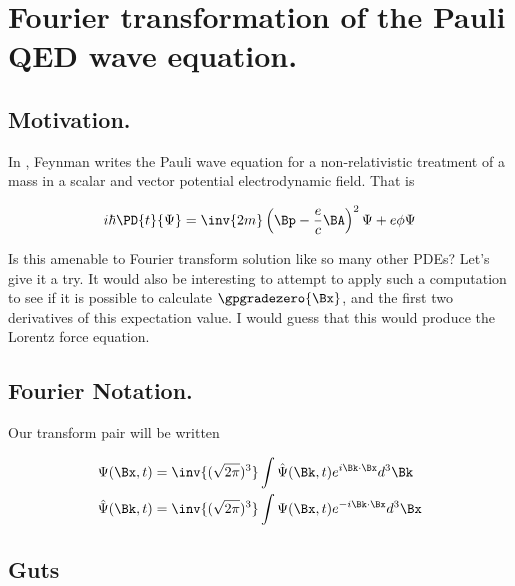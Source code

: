 
%

\chapter{Fourier transformation of the Pauli QED wave equation.}
\label{chap:pauliFourier}
{}
\date{May 29, 2010}

\beginArtNoToc

\section{Motivation.}

In \cite{feynman1961qed}, Feynman writes the Pauli wave equation for a non-relativistic treatment of a mass in a scalar and vector potential electrodynamic field.  That is

\begin{align}\label{eqn:pauliFourier:1}
i \hbar \PD{t}{\Psi} = \inv{2m} \left( \Bp - \frac{e}{c} \BA \right)^2 \Psi + e \phi \Psi
\end{align}

Is this amenable to Fourier transform solution like so many other PDEs?  Let's give it a try.  It would also be interesting to attempt to apply such a computation to see if it is possible to calculate $\gpgradezero{\Bx}$, and the first two derivatives of this expectation value.  I would guess that this would produce the Lorentz force equation.

\section{Fourier Notation.}

Our transform pair will be written

\begin{subequations}
\begin{align}
\Psi(\Bx, t) &= \inv{(\sqrt{2 \pi})^3} \int \hat{\Psi}(\Bk, t) e^{i \Bk \cdot \Bx} d^3 \Bk \label{eqn:pauliFourier:2a} \\
\hat{\Psi}(\Bk, t) &= \inv{(\sqrt{2 \pi})^3} \int \Psi(\Bx, t) e^{-i \Bk \cdot \Bx} d^3 \Bx \label{eqn:pauliFourier:2b}
\end{align}
\end{subequations}

\section{Guts}

